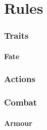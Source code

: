 \chapter{Rules}

\physicalSkillChart

\mentalSkillChart

\begin{multicols}{2}

\subsection*{Traits}





\subsubsection*{Fate}


\subsubsection*{}




\subsection*{Actions}








\subsection*{Combat}





\commonWeaponsChart

\subsubsection*{Armour}




\end{multicols}
